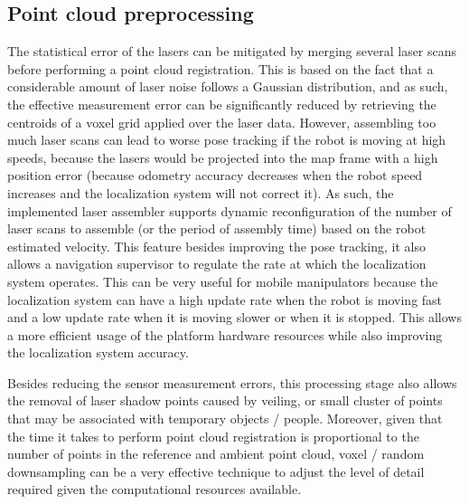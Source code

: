 \subsection{Point cloud preprocessing}

The statistical error of the lasers can be mitigated by merging several laser scans before performing a point cloud registration. This is based on the fact that a considerable amount of laser noise follows a Gaussian distribution, and as such, the effective measurement error can be significantly reduced by retrieving the centroids of a voxel grid applied over the laser data. However, assembling too much laser scans can lead to worse pose tracking if the robot is moving at high speeds, because the lasers would be projected into the map frame with a high position error (because odometry accuracy decreases when the robot speed increases and the localization system will not correct it). As such, the implemented laser assembler supports dynamic reconfiguration of the number of laser scans to assemble (or the period of assembly time) based on the robot estimated velocity. This feature besides improving the pose tracking, it also allows a navigation supervisor to regulate the rate at which the localization system operates. This can be very useful for mobile manipulators because the localization system can have a high update rate when the robot is moving fast and a low update rate when it is moving slower or when it is stopped. This allows a more efficient usage of the platform hardware resources while also improving the localization system accuracy.

Besides reducing the sensor measurement errors, this processing stage also allows the removal of laser shadow points caused by veiling, or small cluster of points that may be associated with temporary objects / people. Moreover, given that the time it takes to perform point cloud registration is proportional to the number of points in the reference and ambient point cloud, voxel / random downsampling can be a very effective technique to adjust the level of detail required given the computational resources available.



\subsection{}


